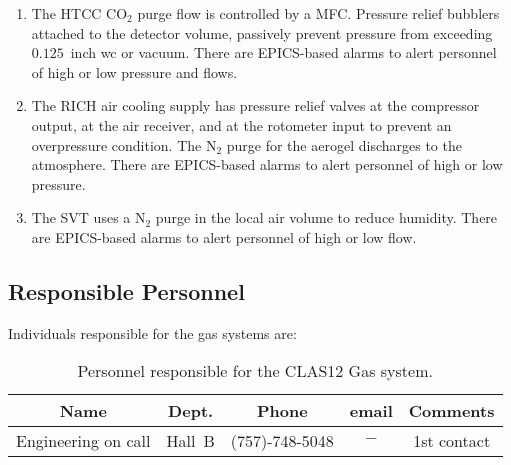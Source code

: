 \begin{enumerate}
\item The HTCC CO$_2$ purge flow is controlled by a MFC. Pressure relief bubblers attached to 
the detector volume, passively prevent pressure from exceeding $0.125$~inch wc or vacuum. There 
are EPICS-based alarms to alert personnel of high or low pressure and flows.

\item The RICH air cooling supply has pressure relief valves at the compressor output, at the 
air receiver, and at the rotometer input to prevent an overpressure condition. The N$_2$ purge 
for the aerogel discharges to the atmosphere. There are EPICS-based alarms to alert personnel 
of high or low pressure.

\item The SVT uses a N$_2$ purge in the local air volume to reduce humidity. There are 
EPICS-based alarms to alert personnel of high or low flow.
\end{enumerate}

\subsection{Responsible Personnel}

Individuals responsible for the gas systems are:

\begin{table}[!htb]
\centering
\begin{tabular}{|c|c|c|c|c|} \hline
Name&Dept.&Phone&email&Comments \\ \hline
Engineering on call&Hall~B&(757)-748-5048&$-$& 1st contact \\ \hline
\end{tabular}
\caption{Personnel responsible for the CLAS12 Gas system.} 
\label{tb:gas}
\end{table}

